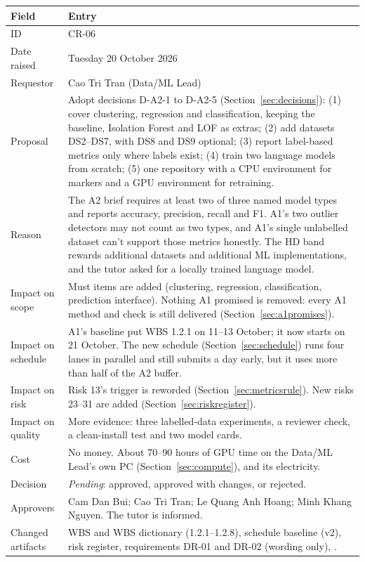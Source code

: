 \begin{center}
\small
\begin{tabularx}{\textwidth}{@{}L{3.0cm}Y@{}}
\toprule
\textbf{Field} & \textbf{Entry} \\
\midrule
ID & CR-06 \\
Date raised & Tuesday 20 October 2026 \\
Requestor & Cao Tri Tran (Data/ML Lead) \\
Proposal & Adopt decisions D-A2-1 to D-A2-5 (Section~\ref{sec:decisions}): (1) cover clustering, regression and classification, keeping the baseline, Isolation Forest and LOF as extras; (2) add datasets DS2--DS7, with DS8 and DS9 optional; (3) report label-based metrics only where labels exist; (4) train two language models from scratch; (5) one repository with a CPU environment for markers and a GPU environment for retraining. \\
Reason & The A2 brief requires at least two of three named model types and reports accuracy, precision, recall and F1. A1's two outlier detectors may not count as two types, and A1's single unlabelled dataset can't support those metrics honestly. The HD band rewards additional datasets and additional ML implementations, and the tutor asked for a locally trained language model. \\
Impact on scope & Must items are added (clustering, regression, classification, prediction interface). Nothing A1 promised is removed: every A1 method and check is still delivered (Section~\ref{sec:a1promises}). \\
Impact on schedule & A1's baseline put WBS 1.2.1 on 11--13 October; it now starts on 21 October. The new schedule (Section~\ref{sec:schedule}) runs four lanes in parallel and still submits a day early, but it uses more than half of the A2 buffer. \\
Impact on risk & Risk 13's trigger is reworded (Section~\ref{sec:metricsrule}). New risks 23--31 are added (Section~\ref{sec:riskregister}). \\
Impact on quality & More evidence: three labelled-data experiments, a reviewer check, a clean-install test and two model cards. \\
Cost & No money. About 70--90 hours of GPU time on the Data/ML Lead's own PC (Section~\ref{sec:compute}), and its electricity. \\
Decision & \textit{Pending}: approved, approved with changes, or rejected. \\
Approvers & Cam Dan Bui; Cao Tri Tran; Le Quang Anh Hoang; Minh Khang Nguyen. The tutor is informed. \\
Changed artifacts & WBS and WBS dictionary (1.2.1--1.2.8), schedule baseline (v2), risk register, requirements DR-01 and DR-02 (wording only), . \\
\bottomrule
\end{tabularx}
\end{center}

